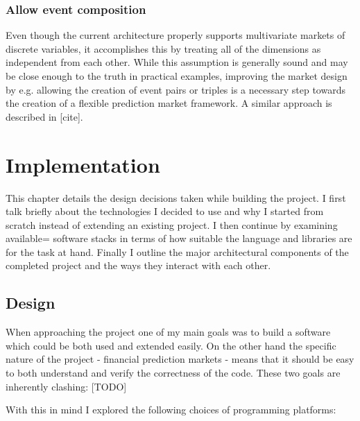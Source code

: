 \documentclass[bsc,frontabs,twoside,singlespacing,parskip,deptreport]{infthesis}     %
\begin{document}
\subsection{Allow event composition}

    Even though the current architecture properly supports multivariate markets of discrete variables, it accomplishes this by treating all of the dimensions as independent from each other. While this assumption is generally sound and may be close enough to the truth in practical examples, improving the market design by e.g. allowing the creation of event pairs or triples is a necessary step towards the creation of a flexible prediction market framework. A similar approach is described in [cite]. 
    

\chapter{Implementation}

    This chapter details the design decisions taken while building the project. I first talk briefly about the technologies I decided to use and why I started from scratch instead of extending an existing project. I then continue by examining available= software stacks in terms of how suitable the language and libraries are for the task at hand. Finally I outline the major architectural components of the completed project and the ways they interact with each other.

\section{Design}

    When approaching the project one of my main goals was to build a software which could be both used and extended easily. On the other hand the specific nature of the project - financial prediction markets - means that it should be easy to both understand and verify the correctness of the code. These two goals are inherently clashing: [TODO]
    
With this in mind I explored the following choices of programming platforms:
\end{document}
